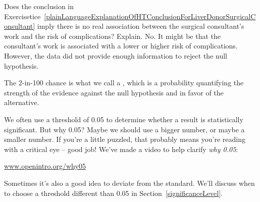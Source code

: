 \begin{example}{Does the conclusion in Exercisetice~\ref{plainLanguageExplanationOfHTConclusionForLiverDonorSurgicalConsultant} imply there is no real association between the surgical consultant's work and the risk of complications? Explain.}
No. It might be that the consultant's work is associated with a lower or higher risk of complications. However, the data did not provide enough information to reject the null hypothesis. %
\end{example}

The 2-in-100 chance is what we call a , which is a probability quantifying the strength of the evidence against the null hypothesis and in favor of the alternative. %




\begin{termBox}{
We often use a threshold of 0.05 to determine whether a result is statistically significant. But why 0.05? Maybe we should use a bigger number, or maybe a smaller number. If you're a little puzzled, that probably means you're reading with a critical eye -- good job! We've made a video to help clarify \emph{why 0.05}:
\begin{center}
\href{http://www.openintro.org/why05}{www.openintro.org/why05}
\end{center}
Sometimes it's also a good idea to deviate from the standard. We'll discuss when to choose a threshold different than 0.05 in Section~\ref{significanceLevel}.\vspace{0.5mm}}
\end{termBox}

